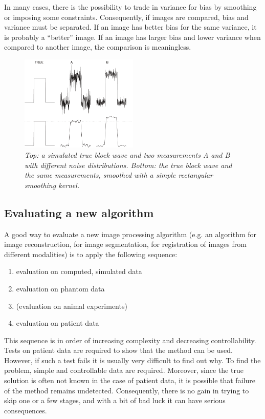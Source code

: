 In many cases, there is the possibility to trade in variance for bias by
smoothing or imposing some constraints. Consequently, if images are compared,
bias and variance must be separated. If an image has better bias for the same
variance, it is probably a ``better'' image. If an image has larger bias and
lower variance when compared to another image, the comparison is meaningless.

\begin{figure}[tb]
\centering
\includegraphics[width=0.5\textwidth]{figs/fig_bias_var.pdf}
\caption{\label{fig:bias_var} \emph{Top: a simulated true block wave and two
measurements A and B with different noise distributions. Bottom: the true
block wave and the same measurements, smoothed with a simple rectangular
smoothing kernel.}}
\end{figure}

\subsection{Evaluating a new algorithm}
A good way to evaluate a new image processing algorithm (e.g. an algorithm for
image reconstruction, for image segmentation, for registration of images from
different modalities) is to apply the following sequence:
\begin{enumerate}
  \item evaluation on computed, simulated data
  \item evaluation on phantom data
  \item (evaluation on animal experiments)
  \item evaluation on patient data
\end{enumerate}
This sequence is in order of increasing complexity and decreasing
controllability. Tests on patient data are required to show that the method
can be used. However, if such a test fails it is usually very difficult to
find out why. To find the problem, simple and controllable data are required.
Moreover, since the true solution is often not known in the case of patient
data, it is possible that failure of the method remains undetected.
Consequently, there is no gain in trying to skip one or a few stages, and with
a bit of bad luck it can have serious consequences.

